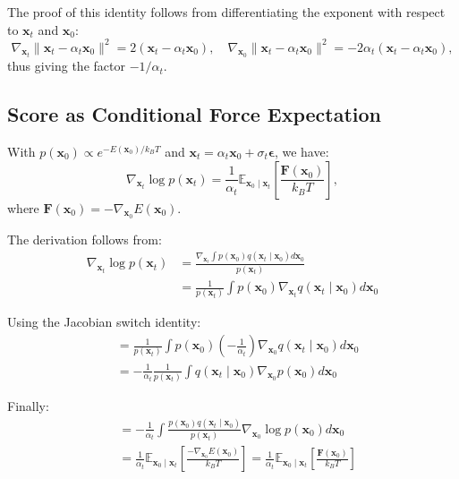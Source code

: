 The proof of this identity follows from differentiating the exponent with respect to $\mathbf{x}_t$ and $\mathbf{x}_0$:
\begin{equation}
\nabla_{\mathbf{x}_t}\|\mathbf{x}_t-\alpha_t\mathbf{x}_0\|^2 = 2(\mathbf{x}_t-\alpha_t\mathbf{x}_0), \quad \nabla_{\mathbf{x}_0}\|\mathbf{x}_t-\alpha_t\mathbf{x}_0\|^2 = -2\alpha_t(\mathbf{x}_t-\alpha_t\mathbf{x}_0),
\end{equation}
thus giving the factor $-1/\alpha_t$.

\subsection{Score as Conditional Force Expectation}

With $p(\mathbf{x}_0) \propto e^{-E(\mathbf{x}_0)/k_B T}$ and $\mathbf{x}_t = \alpha_t \mathbf{x}_0 + \sigma_t \boldsymbol{\epsilon}$, we have:
\begin{equation}
\nabla_{\mathbf{x}_t}\log p(\mathbf{x}_t) = \frac{1}{\alpha_t} \mathbb{E}_{\mathbf{x}_0 \mid \mathbf{x}_t}\left[\frac{\mathbf{F}(\mathbf{x}_0)}{k_B T}\right],
\end{equation}
where $\mathbf{F}(\mathbf{x}_0) = -\nabla_{\mathbf{x}_0}E(\mathbf{x}_0)$.

The derivation follows from:
\begin{align}
\nabla_{\mathbf{x}_t}\log p(\mathbf{x}_t) &= \frac{\nabla_{\mathbf{x}_t}\int p(\mathbf{x}_0) q(\mathbf{x}_t \mid \mathbf{x}_0) d \mathbf{x}_0}{p(\mathbf{x}_t)}\\
&= \frac{1}{p(\mathbf{x}_t)}\int p(\mathbf{x}_0) \nabla_{\mathbf{x}_t} q(\mathbf{x}_t \mid \mathbf{x}_0) d \mathbf{x}_0
\end{align}

Using the Jacobian switch identity:
\begin{align}
&= \frac{1}{p(\mathbf{x}_t)}\int p(\mathbf{x}_0)\left(-\frac{1}{\alpha_t}\right)\nabla_{\mathbf{x}_0} q(\mathbf{x}_t \mid \mathbf{x}_0) d \mathbf{x}_0\\
&= -\frac{1}{\alpha_t} \frac{1}{p(\mathbf{x}_t)}\int q(\mathbf{x}_t \mid \mathbf{x}_0) \nabla_{\mathbf{x}_0} p(\mathbf{x}_0) d \mathbf{x}_0
\end{align}

Finally:
\begin{align}
&= -\frac{1}{\alpha_t}\int \frac{p(\mathbf{x}_0) q(\mathbf{x}_t \mid \mathbf{x}_0)}{p(\mathbf{x}_t)} \nabla_{\mathbf{x}_0}\log p(\mathbf{x}_0) d \mathbf{x}_0\\
&= \frac{1}{\alpha_t} \mathbb{E}_{\mathbf{x}_0 \mid \mathbf{x}_t}\left[\frac{-\nabla_{\mathbf{x}_0}E(\mathbf{x}_0)}{k_B T}\right] = \frac{1}{\alpha_t} \mathbb{E}_{\mathbf{x}_0 \mid \mathbf{x}_t}\left[\frac{\mathbf{F}(\mathbf{x}_0)}{k_B T}\right]
\end{align}

